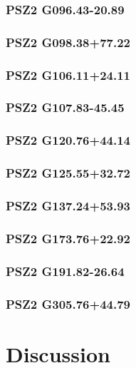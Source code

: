 \documentclass[apj, revtex4-1]{emulateapj}
\begin{document}
\subsubsection{PSZ2 G096.43-20.89}
\subsubsection{PSZ2 G098.38+77.22}
\subsubsection{PSZ2 G106.11+24.11}
\subsubsection{PSZ2 G107.83-45.45}
\subsubsection{PSZ2 G120.76+44.14}
\subsubsection{PSZ2 G125.55+32.72}
\subsubsection{PSZ2 G137.24+53.93}
\subsubsection{PSZ2 G173.76+22.92}
\subsubsection{PSZ2 G191.82-26.64}
\subsubsection{PSZ2 G305.76+44.79}


\section{Discussion}\label{sec:discussion}
\end{document}

